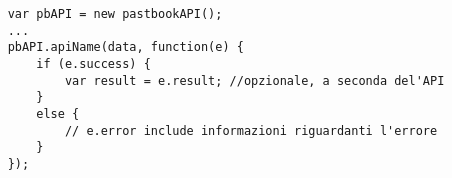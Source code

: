 \begin{lstlisting}
	var pbAPI = new pastbookAPI();
	...
	pbAPI.apiName(data, function(e) {
		if (e.success) {
			var result = e.result; //opzionale, a seconda del'API
		}
		else {
			// e.error include informazioni riguardanti l'errore
		}
	});
\end{lstlisting}

